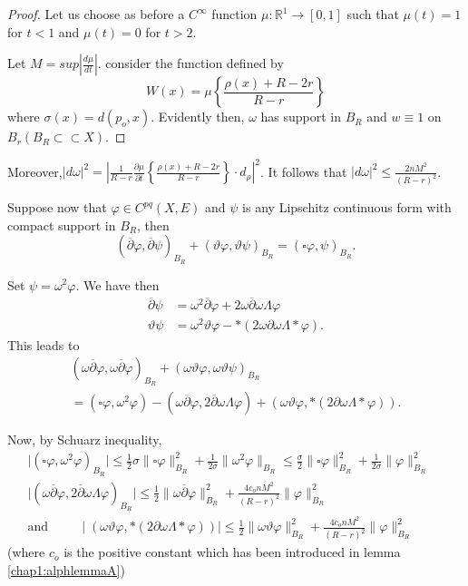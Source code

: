 \begin{proof} 
  Let us choose as before a $C^\infty$ function $\mu: \mathbb{R}^1 \rightarrow
  [0,1]$ such that $\mu (t)=1$  for $t<1$ and $\mu (t)=0$ for $t>2$. 

  Let $M = sup |\frac{d \mu}{dt}|$. consider the function defined by 
  $$ 
  W( x)= \mu \left\{ \frac{\rho(x) + R - 2r  }{R-r}\right\}
  $$ 
  where $\sigma ( x)= d(p_o,x)$. Evidently then,  $\omega$   has
  support in $B_R$ and $ w \equiv 1$ on $B_r (B_R \subset \subset X)$. 
\end{proof}

Moreover,\pageoriginale $|d\omega|^2 = | \frac{1}{R-r} \frac{\partial
  \mu}{\partial t} 
\left\{\frac{\rho (x)+R-2r}{R-r}\right\} \cdot d_\rho|^2$. It follows 
 that $|d \omega|^2 \leq \frac{2nM^2}{(R-r)^2}$.

 Suppose now that $\varphi
 \in C^{pq}(X,E)$ and $\psi$ is any Lipschitz continuous form with
 compact support in $B_R$, then 
 $$
 (\overline{\partial}\varphi, \overline{\partial}\psi)_{B_R}+ 
 (\vartheta\varphi , \vartheta \psi)_{B_R}= (\square \varphi,
 \psi)_{B_R}.
 $$
 
 Set $\psi = \omega^2 \varphi$. We have then
 \begin{align*}
   \overline{\partial} \psi & = \omega^2 \overline{\partial}\varphi + 2
   \omega \overline{\partial}\omega \Lambda \varphi \\ 
   \vartheta \psi & =  \omega^2 \vartheta \varphi - * (2 \omega
   \partial \omega \Lambda * \varphi). 
 \end{align*} 
 This leads to 
 \begin{multline*}
   (\omega \overline{\partial}\varphi , \omega
   \overline{\partial}\varphi)_{B_R}+(\omega \vartheta \varphi ,
   \omega \vartheta \psi)_{B_R}\\ 
    =(\square \varphi, \omega^2 \varphi) -(\omega
   \overline{\partial}\varphi,2 \overline{\partial}\omega \Lambda
   \varphi)+(\omega \vartheta \varphi , *(2 \partial \omega
   \Lambda * \varphi)). 
 \end{multline*}
 
 Now, by Schuarz inequality,
\begin{gather*}
  \mid (\square \varphi, \omega^2 \varphi )_{B_R}\mid \leq \frac{1}{2}
  \sigma \| \square \varphi \|^2_{B_R} + \frac{1}{2\sigma}\|\omega^2
  \varphi \|_{B_R} \leqslant \frac{\sigma}{2}\| \square \varphi
  \|^2_{B_R}+ \frac{1}{2\sigma}\| \varphi \|^2_{B_R}\\
  \mid (\omega \overline {\partial} \varphi, 2
  \overline{\partial}\omega \Lambda \varphi)_{B_R}\mid \leqslant
  \frac{1}{2}\| \omega \overline {\partial} \varphi
  \|^2_{B_R}+\frac{4c_onM^2}{(R-r)^2} \|\varphi \|^2_{B_R}\\ 
 \text{and}\hspace{1cm} 
 \mid (\omega \vartheta \varphi , *(2\partial \omega \Lambda * \varphi
 ))\mid \leqslant \frac{1}{2}\| \omega \vartheta \varphi \|^2_{B_R}+
 \frac{4c_onM^2}{(R-r)^2}\| \varphi \|^2_{B_R}\hspace{1cm}
\end{gather*}
(where $c_o$ is the positive constant which has been introduced in
lemma \ref{chap1:alphlemmaA}) 

